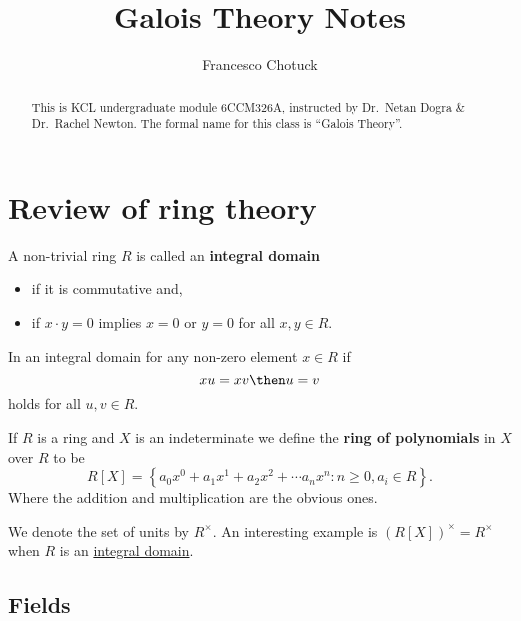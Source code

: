 \documentclass[12pt, a4paper]{article}
\title{Galois Theory Notes}
\date{}
\author{Francesco Chotuck}
\begin{document}
\maketitle

\begin{abstract}
    \noindent This is KCL undergraduate module 6CCM326A, instructed by Dr.\ Netan Dogra \& Dr.\ Rachel Newton. The formal name for this class is ``Galois Theory''.
\end{abstract}

\tableofcontents

\pagebreak

\section{Review of ring theory}

\begin{definition}
    A non-trivial ring \(R\) is called an \textbf{integral domain} \begin{itemize}
        \item if it is commutative and, 
        \item if \(x \cdot y =0\) implies \(x=0\) or \(y=0\) for all \(x,y\in R\).
    \end{itemize}
\end{definition}

\begin{mdprop}
    In an integral domain for any non-zero element \(x \in R\) if
    \[xu=xv \then u=v\]
    holds for all \(u,v \in R\).
\end{mdprop}

\begin{definition}
    If \(R\) is a ring and \(X\) is an indeterminate we define the \textbf{ring of polynomials} in \(X\) over \(R\) to be 
    \[R[X] = \left\{ a_0x^0+a_1x^1+a_2x^2+\cdots a_n x^n :n\geq 0, a_i \in R \right\}.\]
    Where the addition and multiplication are the obvious ones.
\end{definition}

\begin{example}
    We denote the set of units by \(R^{\times}\). An interesting example is \(\left( R[X] \right)^{\times}=R^{\times}\) when \(R\) is an \ul{integral domain}.
\end{example}

\subsection{Fields}
\end{document}
